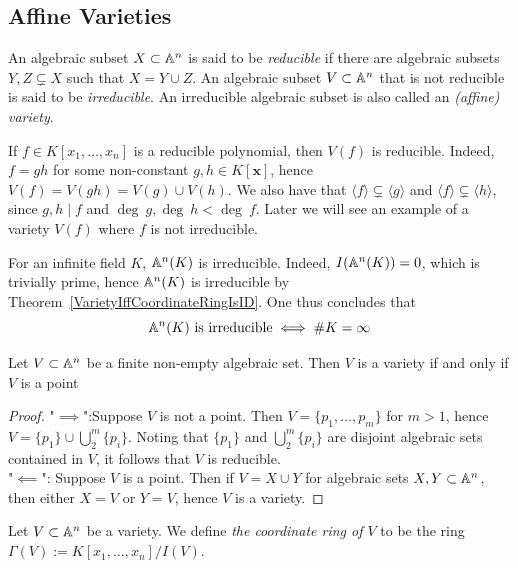 \subsection{Affine Varieties}
\begin{definition}
    An algebraic subset $X\subset \mathbb{A}^n$ is said to be \textit{reducible} if there are algebraic subsets $Y,Z\subsetneq X$ such that $X = Y \cup Z$. An algebraic subset $V\subset \mathbb{A}^n$ that is not reducible is said to be \textit{irreducible}. An irreducible algebraic subset is also called an \textit{(affine) variety}.  
\end{definition}
\begin{remark}
    If $f\in K[x_1,\dots,x_n]$ is a reducible polynomial, then $V(f)$ is reducible. Indeed, $f=gh$ for some non-constant $g,h\in K[\mathbf{x}]$, hence $V(f)=V(gh)=V(g)\cup V(h)$. We also have that $\langle f\rangle \subsetneq \langle g\rangle$ and $\langle f\rangle \subsetneq \langle h \rangle$, since $g,h\mid f$ and $\deg \ g,\deg \ h <\deg \ f$. Later we will see an example of a variety $V(f)$ where $f$ is not irreducible.
\end{remark}
\begin{example}
    For an infinite field $K$, $\mathbb{A}^n(K)$ is irreducible.
   Indeed,  $I(\mathbb{A}^n(K)) = 0$, which is trivially prime, hence $\mathbb{A}^n(K)$ is irreducible by Theorem~\ref{VarietyIffCoordinateRingIsID}. One thus concludes that 
   $$
        \mathbb{A}^n(K) \text{ is irreducible} \iff \#K=\infty
   $$
\end{example}
\begin{proposition}\label{FiniteNonEmptyVarietiesArePoints}
    Let $V\subset \mathbb{A}^n$ be a finite non-empty algebraic set. Then $V$ is a variety if and only if $V$ is a point 
\end{proposition}
\begin{proof}
    "$\implies$":Suppose $V$ is not a point. Then $V=\{p_1,\dots,p_m\}$ for $m>1$, hence $V = \{p_1\} \cup \bigcup_2^m \{p_i\}$. Noting that $\{p_1\}$ and $\bigcup_2^m\{ p_i\}$ are disjoint algebraic sets contained in $V$, it follows that $V$ is reducible.\\
    "$\impliedby$": Suppose $V$ is a point. Then if $V = X \cup Y$ for algebraic sets $X,Y\subset \mathbb{A}^n$, then either $X=V$ or $Y=V$, hence $V$ is a variety. 
\end{proof}
\begin{definition}
    Let $V\subset \mathbb{A}^n$ be a variety. We define \textit{the coordinate ring of $V$} to be the ring $\Gamma(V):=K[x_1,\dots,x_n]/I(V)$. 
\end{definition}
